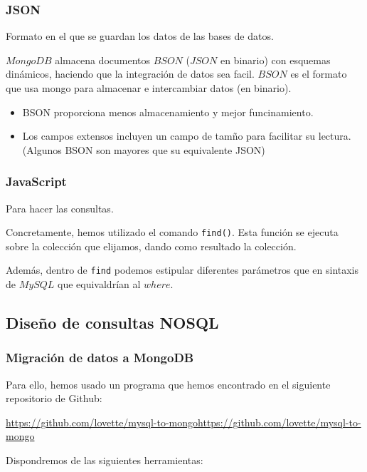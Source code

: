 \documentclass[12pt,a4paper]{article}
\begin{document}
\subsubsection{JSON} \label{pto512}

Formato en el que se guardan los datos de las bases de datos.

$MongoDB$ almacena documentos $BSON$ ($JSON$ en binario) con esquemas dinámicos, haciendo que la integración de datos sea facil.
$BSON$ es el formato que usa mongo para almacenar e intercambiar datos (en binario).

\begin{itemize}
\item BSON proporciona menos almacenamiento y mejor funcinamiento.
\item Los campos extensos incluyen un campo de tamño para facilitar su lectura. (Algunos BSON son mayores que su equivalente JSON)
\end{itemize}


\subsubsection{JavaScript}  \label{pto513} 

Para hacer las consultas.

Concretamente, hemos utilizado el comando \verb|find()|.
Esta función se ejecuta sobre la colección que elijamos, dando como resultado la colección.

Además, dentro de \verb|find| podemos estipular diferentes parámetros que en sintaxis de $MySQL$ que equivaldrían al $where$.


\newpage
\subsection{Diseño de consultas NOSQL}  \label{pto52}

\subsubsection{Migración de datos a MongoDB} \label{pto521}

Para ello, hemos usado un programa que hemos encontrado en el siguiente repositorio de Github:

\url{https://github.com/lovette/mysql-to-mongohttps://github.com/lovette/mysql-to-mongo}

Dispondremos de las siguientes herramientas:
\end{document}
